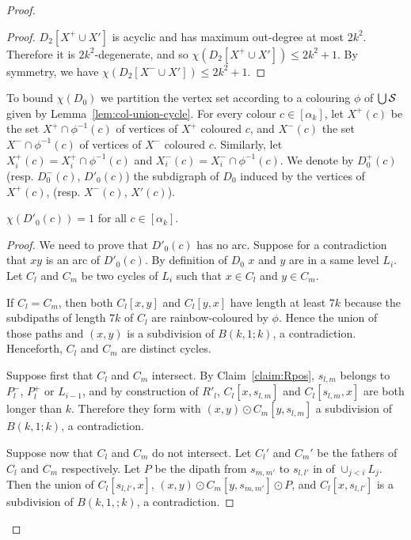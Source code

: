 \documentclass{endm}
\begin{document}
\begin{proof}
\begin{proof}
$D_2[X^+\cup X']$ is acyclic and has maximum out-degree at most $2k^2$. Therefore it is $2k^2$-degenerate, and so $ \chi(D_2[X^+\cup X'])\leq 2k^2 +1$.
By symmetry, we have $ \chi(D_2[X^-\cup X'])\leq 2k^2 +1$.
\end{proof}




To bound $\chi(D_0)$ we partition the vertex set according to a colouring $\phi$ of $\bigcup {\cal S}$ given by Lemma~\ref{lem:col-union-cycle}.
For every colour $c\in [\alpha_k]$, let $X^+(c)$ be the set $X^+\cap \phi^{-1}(c)$ of vertices of $X^+$ coloured $c$, and $X^-(c)$ the set $X^-\cap \phi^{-1}(c)$ of vertices of $X^-$ coloured $c$. Similarly, let  $X^+_i(c)= X^+_i\cap \phi^{-1}(c)$ and $X^-_i(c)= X^-_i\cap \phi^{-1}(c)$.
We denote by $D^+_0(c)$ (resp. $D^-_0(c)$, $D'_0(c)$) the subdigraph of $D_0$ induced by the vertices of $X^+(c)$, (resp. $X^-(c)$, $X'(c)$).

\begin{claim} \label{claim:X'}
$\chi(D'_0(c))= 1$ for all $c\in [\alpha_k]$.
\end{claim}

\begin{proof}
We need to prove that $D'_0(c)$ has no arc.
Suppose for a contradiction that $xy$ is an arc of $D'_0(c)$. 
By definition of $D_0$ $x$ and $y$ are in a same level $L_i$.
Let $C_l$ and $C_m$ be two cycles of $L_i$ such that $x \in C_l$ and $y \in C_m$.

If $C_l=C_m$, then both $C_l[x,y]$ and $C_l[y,x]$ have length at least $7k$ because the subdipaths of  length $7k$ of $C_l$ are rainbow-coloured by $\phi$. Hence the union of those paths and $(x,y)$ is  a subdivision of $B(k,1;k)$, a contradiction.
Henceforth, $C_l$ and $C_m$ are distinct cycles.



Suppose first that $C_l$ and $C_m$ intersect. By Claim~\ref{claim:Rpos}, $s_{l,m}$
belongs to $P^-_l$, $P^+_l$ or $L_{i-1}$, and by construction of $R'_l$, $C_l[x,s_{l,m}]$ and 
$C_l[s_{l,m},x]$ are both longer than $k$. Therefore they form with $(x,y) \odot C_m[y,s_{l,m}]$ a subdivision of $B(k,1;k)$, a contradiction.

Suppose now that $C_l$ and $C_m$ do not intersect. Let $C_l'$ and $C_m'$ be the fathers of $C_l$ and $C_m$ respectively. 
Let $P$ be the dipath  from $s_{m,m'}$ to $s_{l,l'}$ in of $\cup_{j<i} L_j$. Then the union of $C_l[s_{l,l'}, x]$,
$(x,y) \odot C_m[y, s_{m,m'}] \odot P$, and $C_l[x,s_{l,l'}]$ is a subdivision of $B(k,1,;k)$, a contradiction.
\end{proof}










\end{proof}
\end{document}
